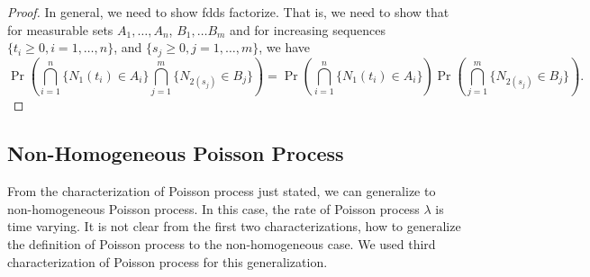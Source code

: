 \documentclass[a4paper,10pt,english]{article}
\begin{document}
\begin{proof}
In general, we need to show fdds factorize. That is, we need to show that for measurable sets $A_1, \hdots, A_n$, $B_1, \hdots B_m$ and for increasing sequences $\{t_i \geqslant 0, i = 1, \ldots, n\}$, and $\{s_j \geqslant 0, j = 1, \ldots, m\}$, we have \begin{equation*}
   \Pr\left(\bigcap_{i=1}^n\{N_{1}(t_{i})\in A_{i}\}\bigcap_{j=1}^m\{N_{2(s_{j})}\in B_{j}\}\right)
   =\Pr\left(\bigcap_{i=1}^n\{N_{1}(t_{i})\in A_{i}\}\right)\Pr\left(\bigcap_{j=1}^m\{N_{2(s_{j})}\in B_{j}\}\right).
\end{equation*}
\end{proof}

\subsection{Non-Homogeneous Poisson Process}
From the characterization of Poisson process just stated, we can generalize to non-homogeneous Poisson process. In this case, the rate of Poisson process $\lambda$ is time varying. It is not clear from the first two characterizations, how to generalize the definition of Poisson process to the non-homogeneous case. We used third characterization of Poisson process for this generalization. 
\end{document}
